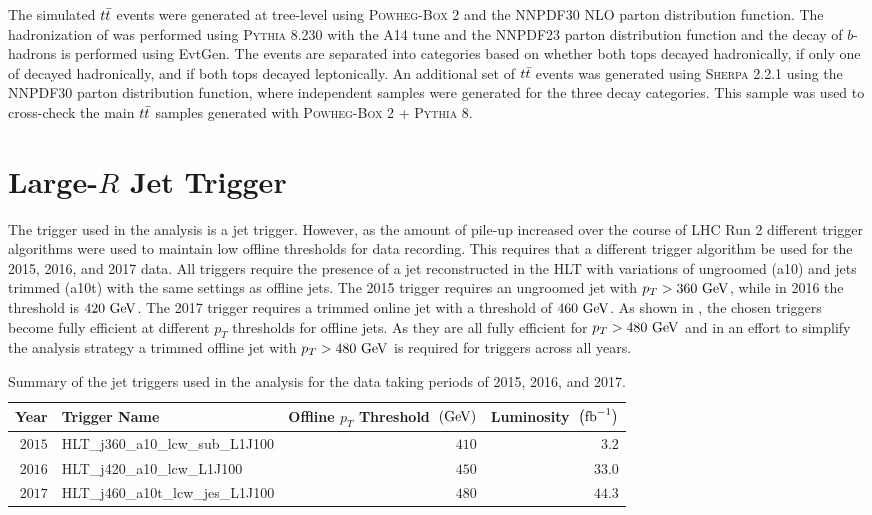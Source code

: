 The simulated $t\bar{t}$ events were generated at tree-level using \textsc{Powheg-Box} 2 and the NNPDF30 NLO parton distribution function.
The hadronization of was performed using \textsc{Pythia} 8.230 with the A14 tune and the NNPDF23 parton distribution function and the decay of $b$-hadrons is performed using EvtGen.
The events are separated into categories based on whether both tops decayed hadronically, if only one of decayed hadronically, and if both tops decayed leptonically.
An additional set of $t\bar{t}$ events was generated using \textsc{Sherpa} 2.2.1 using the NNPDF30 parton distribution function, where independent samples were generated for the three decay categories.
This sample was used to cross-check the main $t\bar{t}$ samples generated with \textsc{Powheg-Box} 2 + \textsc{Pythia} 8.

\section{Large-$R$ Jet Trigger}\label{sec:analysis_trigger}

The trigger used in the analysis is a \largeR{} jet trigger.
However, as the amount of pile-up increased over the course of LHC Run 2 different \largeR{} trigger algorithms were used to maintain low offline thresholds for data recording.
This requires that a different trigger algorithm be used for the 2015, 2016, and 2017 data.
All triggers require the presence of a \largeR{} jet reconstructed in the \gls{HLT} with variations of ungroomed (a10) and \largeR{} jets trimmed (a10t) with the same settings as offline \largeR{} jets.
The 2015 trigger requires an ungroomed \largeR{} jet with $p_{T} > 360~\mathrm{GeV}$, while in 2016 the threshold is $420~\mathrm{GeV}$.
The 2017 trigger requires a trimmed online jet with a threshold of $460~\mathrm{GeV}$.
As shown in , the chosen triggers become fully efficient at different $p_{T}$ thresholds for offline \largeR{} jets.
As they are all fully efficient for $p_{T} > 480~\mathrm{GeV}$ and in an effort to simplify the analysis strategy a trimmed offline jet with $p_{T} > 480~\mathrm{GeV}$ is required for triggers across all years.

\begin{table}[htpb]
 \centering
 \caption[Summary of the triggers used in the analysis.]{%
  Summary of the \largeR{} jet triggers used in the analysis for the data taking periods of 2015, 2016, and 2017.}
 \begin{tabular}{@{}rlrr@{}}
  \toprule
  Year   & Trigger Name                 & Offline $p_{T}$ Threshold~$(\mathrm{GeV})$ & Luminosity~$\left(\mathrm{fb}^{-1}\right)$ \\ \midrule
  $2015$ & HLT_j360_a10_lcw_sub_L1J100  & $410$                              & $3.2$                          \\
  $2016$ & HLT_j420_a10_lcw_L1J100      & $450$                              & $33.0$                         \\
  $2017$ & HLT_j460_a10t_lcw_jes_L1J100 & $480$                              & $44.3$                         \\
  \bottomrule
 \end{tabular}
 \label{table:annual_triggers}
\end{table}


